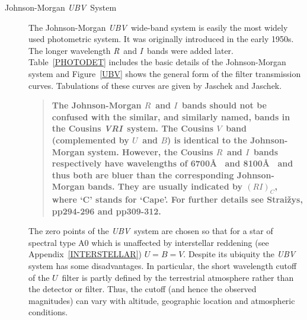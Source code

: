 \documentclass[twoside,11pt,nolof]{starlink}
\begin{document}
\begin{description}

  \item[Johnson-Morgan \textit{UBV}\, System] The Johnson-Morgan \textit{UBV}\,
   wide-band system\cite{JOHNSON51, JOHNSON53} is easily the most widely
   used photometric system.  It was originally introduced in the early
   1950s.  The longer wavelength \textit{R}\, and \textit{I}\, bands were added
   later\cite{JOHNSON65}.  Table~\ref{PHOTODET} includes the basic details
   of the Johnson-Morgan system and Figure~\ref{UBV} shows the general
   form of the filter transmission curves.  Tabulations of these curves
   are given by Jaschek and Jaschek\cite{JASCHEK87}.

  \begin{quote}
   \textbf{The Johnson-Morgan $R$\, and $I$\, bands should not be confused
   with the similar, and similarly named, bands in the Cousins \textit{VRI}\,
   system\cite{COUSINS76, COUSINS78}.  The Cousins $V$\, band
   (complemented by $U$\, and $B$) is identical to the Johnson-Morgan
   system.  However, the Cousins $R$\, and $I$\, bands respectively have
   wavelengths of 6700\AA~ and 8100\AA~ and thus both are bluer than the
   corresponding Johnson-Morgan bands.  They are usually indicated by
   $(RI)_{C}$, where `C' stands for `Cape'.  For further details see
   Strai\v{z}ys\cite{STRAIZYS92}, pp294-296 and pp309-312.}
  \end{quote}

   The zero points of the \textit{UBV}\, system are chosen so that for a star
   of spectral type A0 which is unaffected by interstellar reddening (see
   Appendix~\ref{INTERSTELLAR}) $U = B = V$.  Despite its ubiquity the
   \textit{UBV}\, system has some disadvantages.  In particular, the short
   wavelength  cutoff of the $U$\, filter is partly defined by the
   terrestrial atmosphere rather than the detector or filter.  Thus, the
   cutoff (and hence the observed magnitudes) can vary with altitude,
   geographic location and atmospheric conditions.

  \begin{table}[htbp]


\end{table}
\end{description}
\end{document}
